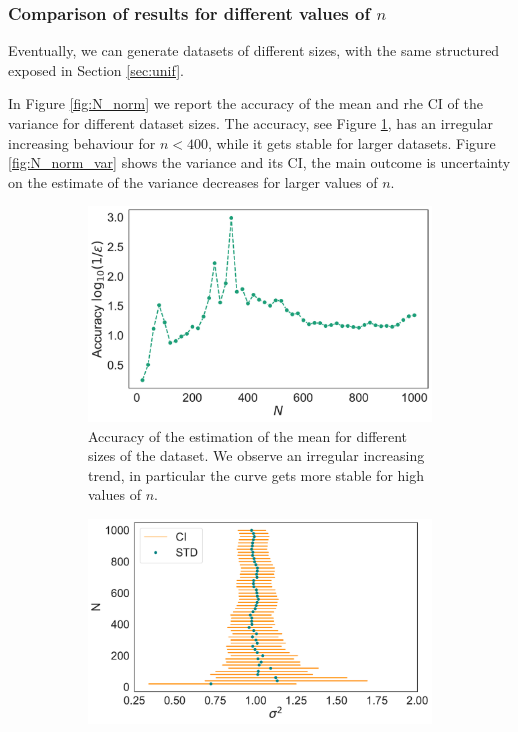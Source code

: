 \documentclass[twoside,onecolumn]{article}
\theoremstyle{definition}
\begin{document}
\subsubsection{Comparison of results for different values of $n$}
Eventually, we can generate datasets of different sizes, with the same structured exposed in Section \ref{sec:unif}.  

In Figure \ref{fig:N_norm} we report the accuracy of the mean and rhe CI of the variance for different dataset sizes. The accuracy, see Figure \ref{fig:N_norm_acc}, has an irregular increasing behaviour for $n<400$, while it gets stable for larger datasets. Figure \ref{fig:N_norm_var} shows the variance and its CI, the main outcome is uncertainty on the estimate of the variance decreases for larger values of $n$.

\begin{figure} \centering
\begin{subfigure}{0.45\textwidth}
         \includegraphics[width=\textwidth]{../figs/norm_mean_accuracy.pdf}
         \caption{Accuracy of the estimation of the mean for different sizes of the dataset. We observe an irregular increasing trend, in particular the curve gets more stable for high values of $n$.}\label{fig:N_norm_acc}
              \end{subfigure}
     \begin{subfigure}{0.5\textwidth}
         \includegraphics[width=\textwidth]{../figs/norm_variance_CI.pdf}

\end{subfigure}
\end{figure}
\end{document}
